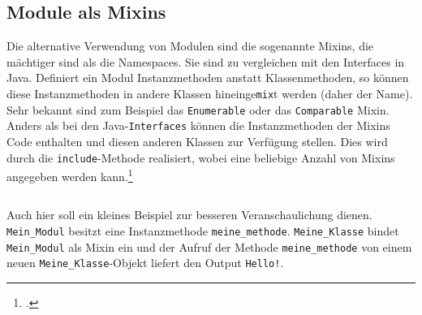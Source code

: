\documentclass[a4paper, 11pt]{scrreprt}
\begin{document}
\subsection{Module als Mixins}
Die alternative Verwendung von Modulen sind die sogenannte Mixins, die mächtiger sind als die Namespaces. Sie sind zu vergleichen mit den Interfaces in Java. Definiert ein Modul Instanzmethoden anstatt Klassenmethoden, so können diese Instanzmethoden in andere Klassen hineinge\texttt{mix}t werden (daher der Name). Sehr bekannt sind zum Beispiel das \texttt{Enumerable} oder das \texttt{Comparable} Mixin. Anders als bei den Java-\texttt{Interfaces} können die Instanzmethoden der Mixins Code enthalten und diesen anderen Klassen zur Verfügung stellen. Dies wird durch die \texttt{include}-Methode realisiert, wobei eine beliebige Anzahl von Mixins angegeben werden kann.\footcite[vgl.][S.250-251]{ruby_lang}
\inputminted[]{ruby}{mixin.rb}
Auch hier soll ein kleines Beispiel zur besseren Veranschaulichung dienen. \texttt{Mein\_Modul} besitzt eine Instanzmethode \texttt{meine\_methode}. \texttt{Meine\_Klasse} bindet \texttt{Mein\_Modul} als Mixin ein und der Aufruf der Methode \texttt{meine\_methode} von einem neuen \texttt{Meine\_Klasse}-Objekt liefert den Output \texttt{Hello!}. 
\end{document}
